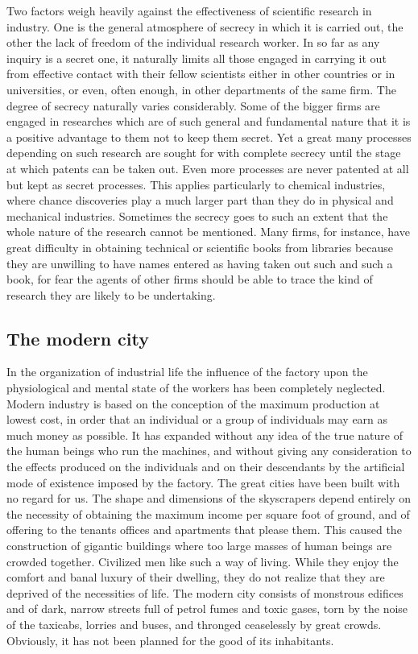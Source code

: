 \documentclass[11pt]{article}
\begin{document}
Two factors weigh heavily against the effectiveness of scientific research in industry. One is the general atmosphere of secrecy in which it is carried out, the other the lack of freedom of the individual research worker. In so far as any inquiry is a secret one, it naturally limits all those engaged in carrying it out from effective contact with their fellow scientists either in other countries or in universities, or even, often enough, in other departments of the same firm. The degree of secrecy naturally varies considerably. Some of the bigger firms are engaged in researches which are of such general and fundamental nature that it is a positive advantage to them not to keep them secret. Yet a great many processes depending on such research are sought for with complete secrecy until the stage at which patents can be taken out. Even more processes are never patented at all but kept as secret processes. This applies particularly to chemical industries, where chance discoveries play a much larger part than they do in physical and mechanical industries. Sometimes the secrecy goes to such an extent that the whole nature of the research cannot be mentioned. Many firms, for instance, have great difficulty in obtaining technical or scientific books from libraries because they are unwilling to have names entered as having taken out such and such a book, for fear the agents of other firms should be able to trace the kind of research they are likely to be undertaking.
\subsection{The modern city}
\label{sec-2-16}

In the organization of industrial life the influence of the factory upon the physiological and mental state of the workers has been completely neglected. Modern industry is based on the conception of the maximum production at lowest cost, in order that an individual or a group of individuals may earn as much money as possible. It has expanded without any idea of the true nature of the human beings who run the machines, and without giving any consideration to the effects produced on the individuals and on their descendants by the artificial mode of existence imposed by the factory. The great cities have been built with no regard for us. The shape and dimensions of the skyscrapers depend entirely on the necessity of obtaining the maximum income per square foot of ground, and of offering to the tenants offices and apartments that please them. This caused the construction of gigantic buildings where too large masses of human beings are crowded together. Civilized men like such a way of living. While they enjoy the comfort and banal luxury of their dwelling, they do not realize that they are deprived of the necessities of life. The modern city consists of monstrous edifices and of dark, narrow streets full of petrol fumes and toxic gases, torn by the noise of the taxicabs, lorries and buses, and thronged ceaselessly by great crowds. Obviously, it has not been planned for the good of its inhabitants.
\end{document}
